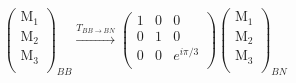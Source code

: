 \documentclass[12pt,a4paper]{article}
\newcounter{arrow}
\begin{document}
\begin{align}
\left( \begin{matrix}
\text{M}_1\\
\text{M}_2\\
\text{M}_3\\
\end{matrix} \right)_{BB} 
\xrightarrow{T_{BB \rightarrow BN}} 
\left(\begin{matrix} 
1 & 0 &0 \\
0 & 1 & 0 \\
0 & 0 & e^{i \pi /3} \\
\end{matrix} \right)
\left( \begin{matrix}
\text{M}_1\\
\text{M}_2\\
\text{M}_3\\
\end{matrix} \right)_{BN}
\end{align}
\end{document}
